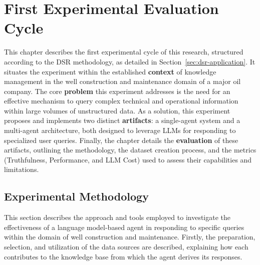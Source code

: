 
\chapter{First Experimental Evaluation Cycle}


    This chapter describes the first experimental cycle of this research, structured according to the DSR methodology, as detailed in Section~\ref{sec:dsr-application}. It situates the experiment within the established \textbf{context} of knowledge management in the well construction and maintenance domain of a major oil company. The core \textbf{problem} this experiment addresses is the need for an effective mechanism to query complex technical and operational information within large volumes of unstructured data. As a solution, this experiment proposes and implements two distinct \textbf{artifacts}: a single-agent system and a multi-agent architecture, both designed to leverage LLMs for responding to specialized user queries. Finally, the chapter details the \textbf{evaluation} of these artifacts, outlining the methodology, the dataset creation process, and the metrics (Truthfulness, Performance, and LLM Cost) used to assess their capabilities and limitations.


    

    \section{Experimental Methodology}

        This section describes the approach and tools employed to investigate the effectiveness of a language model-based agent in responding to specific queries within the domain of well construction and maintenance.
        Firstly, the preparation, selection, and utilization of the data sources are described, explaining how each contributes to the knowledge base from which the agent derives its responses.
        

